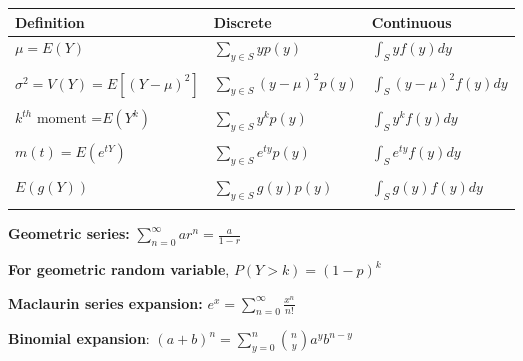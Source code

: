 \documentclass[
  letterpaper,
  DIV=11,
  numbers=noendperiod]{scrartcl}
\begin{document}
\begin{longtable}[]{@{}
  >{\raggedright\arraybackslash}p{}
  >{\raggedright\arraybackslash}p{}
  >{\raggedright\arraybackslash}p{}@{}}
\toprule\noalign{}
\begin{minipage}[b]{\linewidth}\raggedright
\textbf{Definition}
\end{minipage} & \begin{minipage}[b]{\linewidth}\raggedright
\textbf{Discrete}
\end{minipage} & \begin{minipage}[b]{\linewidth}\raggedright
\textbf{Continuous}
\end{minipage} \\
\midrule\noalign{}
\endhead
\bottomrule\noalign{}
\endlastfoot
\(\mu = E(Y)\) & \(\sum_{y \in S}yp(y)\) & \(\int_S yf(y)dy\) \\
& & \\
\(\sigma^2 = V(Y) = E[(Y - \mu)^2]\) & \(\sum_{y \in S}(y - \mu)^2p(y)\)
& \(\int_S (y - \mu)^2f(y)dy\) \\
& & \\
\(k^{th} \text{ moment =}E(Y^k)\) & \(\sum_{y \in S}y^kp(y)\) &
\(\int_S y^kf(y)dy\) \\
& & \\
\(m(t) = E(e^{tY})\) & \(\sum_{y \in S}e^{ty}p(y)\) &
\(\int_S e^{ty}f(y)dy\) \\
& & \\
\(E(g(Y))\) & \(\sum_{y \in S}g(y)p(y)\) & \(\int_S g(y)f(y)dy\) \\
& & \\
\end{longtable}

\textbf{Geometric series:}
\(\sum_{n=0}^{\infty} ar^n = \frac{a}{1 - r}\)

\textbf{For geometric random variable}, \(P(Y > k) = (1 - p)^k\)

\textbf{Maclaurin series expansion:}
\(e^x = \sum_{n = 0}^{\infty} \frac{x^n}{n!}\)

\textbf{Binomial expansion}:
\((a + b)^n = \sum_{y=0}^{n} \binom{n}{y} a^{y} b^{n -y}\)
\end{document}
